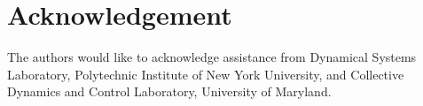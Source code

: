 \documentclass[12pt]{article}
\begin{document}
\section{Acknowledgement}
The authors would like to acknowledge assistance from Dynamical Systems Laboratory, Polytechnic Institute of New York University, and Collective Dynamics and Control Laboratory, University of Maryland.




\end{document}
